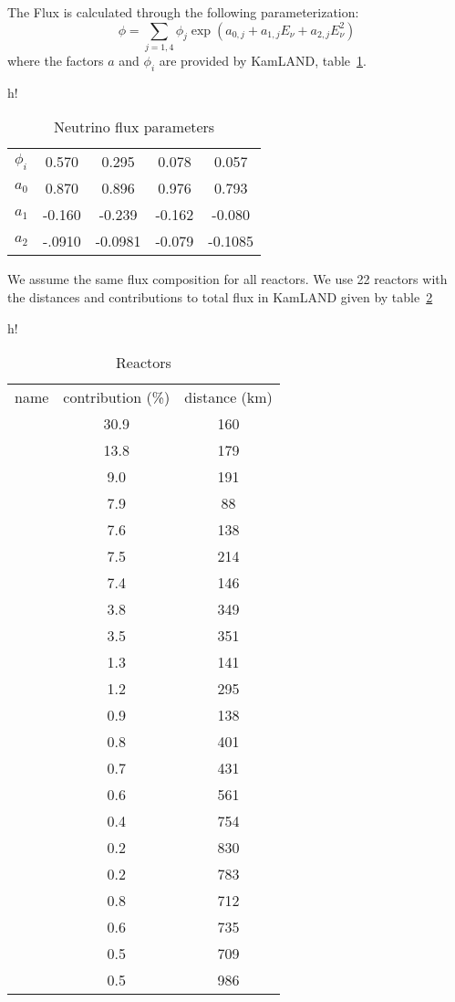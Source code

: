 \documentclass[12pt]{article}
\begin{document}
The Flux is calculated through the following parameterization:
\[
\phi=\sum_{j=1,4}\phi_j\exp{\left(a_{0,j}+a_{1,j}E_\nu+a_{2,j}E_\nu^2\right)}
\]
where the factors $a$ and $\phi_i$ are provided by KamLAND, table~\ref{tab:nuflux}.

\begin{table}{h!}
  \begin{center}
    \caption{Neutrino flux parameters}
    \label{tab:nuflux}
    \begin{tabular}{l|c|c|c|c}
      \hline
      $\phi_i$ & 0.570 & 0.295 & 0.078 & 0.057\\
      $a_0$ & 0.870 & 0.896 & 0.976 & 0.793\\
      $a_1$ &-0.160 &-0.239 &-0.162 &-0.080\\
      $a_2$ &-.0910 &-0.0981&-0.079 &-0.1085\\
      \hline
    \end{tabular}
  \end{center}
\end{table}

We assume the same flux composition for all reactors. We use 22 reactors with the distances and contributions to total flux in KamLAND given by table~\ref{tab:reactors}
        
\begin{table}{h!}
  \begin{center}
    \caption{Reactors}
    \label{tab:reactors}
    \begin{tabular}{l|c|c}
      \hline
      name & contribution (\%) & distance (km)\\
      &30.9 &160 \\
      &13.8 &179 \\
      &9.0  &191 \\
      &7.9  & 88 \\
      &7.6  &138 \\
      &7.5  &214 \\
      &7.4  &146 \\
      &3.8  &349 \\
      &3.5  &351 \\
      &1.3  &141 \\
      &1.2  &295 \\
      &0.9  &138 \\
      &0.8  &401 \\
      &0.7  &431 \\
      &0.6  &561 \\
      &0.4  &754 \\
      &0.2  &830 \\
      &0.2  &783 \\
      &0.8  &712 \\
      &0.6  &735 \\
      &0.5  &709 \\
      &0.5  &986 \\
      \hline
    \end{tabular}
  \end{center}
\end{table}
\end{document}

